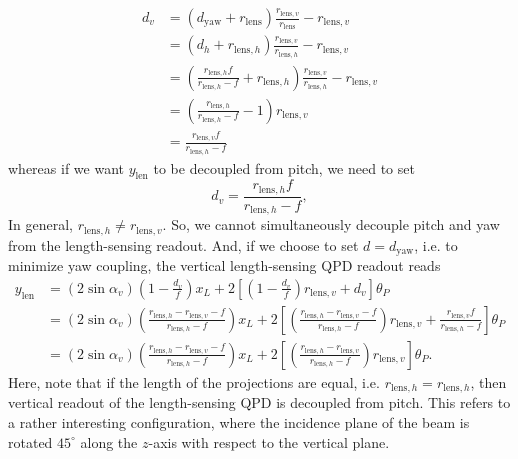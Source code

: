 \begin{equation}
	\begin{split}
	d_v &= \left(d_\mathrm{yaw}+r_\mathrm{lens}\right)\frac{r_{\mathrm{lens},v}}{r_\mathrm{lens}} - r_{\mathrm{lens},v}\\
	&= \left(d_h+r_{\mathrm{lens},h}\right)\frac{r_{\mathrm{lens},v}}{r_{\mathrm{lens},h}}-r_{\mathrm{lens},v}\\
	&= \left(\frac{r_{\mathrm{lens},h}f}{r_{\mathrm{lens},h}-f}+r_{\mathrm{lens},h}\right)\frac{r_{\mathrm{lens},v}}{r_{\mathrm{lens},h}}-r_{\mathrm{lens},v}\\
	&=\left(\frac{r_{\mathrm{lens},h}}{r_{\mathrm{lens},h}-f}-1\right)r_{\mathrm{lens},v}\\
	&=\frac{r_{\mathrm{lens},v}f}{r_{\mathrm{lens},h}-f}
	\end{split}
\end{equation}
whereas if we want $y_\mathrm{len}$ to be decoupled from pitch, we need to set
\begin{equation}
	d_v = \frac{r_{\mathrm{lens},h}f}{r_{\mathrm{lens},h}-f},
\end{equation}
In general, $r_{\mathrm{lens},h}\neq r_{\mathrm{lens},v}$.
So, we cannot simultaneously decouple pitch and yaw from the length-sensing readout.
And, if we choose to set $d=d_\mathrm{yaw}$, i.e. to minimize yaw coupling, the vertical length-sensing QPD readout reads
\begin{equation}
	\begin{split}
	y_\mathrm{len} &= \left(2\sin\alpha_v\right)\left(1-\frac{d_v}{f}\right)x_L + 2\left[\left(1-\frac{d_v}{f}\right)r_{\mathrm{lens},v}+d_v\right]\theta_P\\
	&= \left(2\sin\alpha_v\right)\left(\frac{r_{\mathrm{lens},h}-r_{\mathrm{lens},v}-f}{r_{\mathrm{lens},h}-f}\right)x_L + 2\left[\left(\frac{r_{\mathrm{lens},h}-r_{\mathrm{lens},v}-f}{r_{\mathrm{lens},h}-f}\right)r_{\mathrm{lens},v} + \frac{r_{\mathrm{lens},v}f}{r_{\mathrm{lens},h}-f}\right] \theta_P\\
	&=\left(2\sin\alpha_v\right)\left(\frac{r_{\mathrm{lens},h}-r_{\mathrm{lens},v}-f}{r_{\mathrm{lens},h}-f}\right)x_L
	+ 2\left[\left(\frac{r_{\mathrm{lens},h}-r_{\mathrm{lens},v}}{r_{\mathrm{lens},h}-f}\right)r_{\mathrm{lens},v}\right] \theta_P.
	\end{split}
	\label{eqn:y_len}
\end{equation}
Here, note that if the length of the projections are equal, i.e. $r_{\mathrm{lens},h}=r_{\mathrm{lens},h}$, then vertical readout of the length-sensing QPD is decoupled from pitch.
This refers to a rather interesting configuration, where the incidence plane of the beam is rotated $45^\circ$ along the $z$-axis with respect to the vertical plane.

